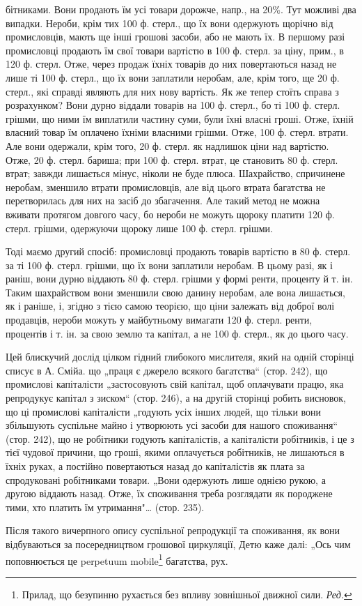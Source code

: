 \parcont{}  %
бітниками. Вони продають їм усі товари дорожче, напр., на 20\%. Тут можливі два випадки. Нероби, крім
тих 100 ф. стерл., що їх вони одержують щорічно від промисловців, мають ще інші грошові засоби, або
не мають їх. В першому разі промисловці продають їм свої товари вартістю в 100 ф. стерл. за ціну,
прим., в 120 ф. стерл. Отже, через продаж їхніх товарів до них повертаються назад не лише ті 100 ф.
стерл., що їх вони заплатили неробам, але, крім того, ще 20 ф. стерл., які справді являють для них
нову вартість. Як же тепер стоїть справа з розрахунком? Вони дурно віддали товарів на 100 ф. стерл.,
бо ті 100 ф. стерл. грішми, що ними їм виплатили частину суми, були їхні власні гроші. Отже, їхній
власний товар їм оплачено їхніми власними грішми. Отже, 100 ф. стерл. втрати. Але вони одержали,
крім того, 20 ф. стерл. як надлишок ціни над вартістю. Отже, 20 ф. стерл. бариша; при 100 ф. стерл.
втрат, це становить 80 ф. стерл. втрат; завжди лишається мінус, ніколи не буде плюса. Шахрайство,
спричинене неробам, зменшило втрати промисловців, але від цього втрата багатства не перетворилась
для них на засіб до збагачення. Але такий метод не можна вживати протягом довгого часу, бо нероби не
можуть щороку платити 120 ф. стерл. грішми, одержуючи щороку лише 100 ф. стерл. грішми.

Тоді маємо другий спосіб: промисловці продають товарів вартістю в 80 ф. стерл. за ті 100 ф. стерл.
грішми, що їх вони заплатили неробам. В цьому разі, як і раніш, вони дурно віддають 80 ф. стерл.
грішми у формі ренти, проценту й т. ін. Таким шахрайством вони зменшили свою данину неробам, але
вона лишається, як і раніше, і, згідно з тією самою теорією, що ціни залежать від доброї волі
продавців, нероби можуть у майбутньому вимагати 120 ф. стерл. ренти, процентів і т. ін. за свою
землю та капітал, а не 100 ф. стерл., як до цього часу.

Цей блискучий дослід цілком гідний глибокого мислителя, який на одній сторінці списує в А. Смійа. що
„праця є джерело всякого багатства“ (стор. 242), що промислові капіталісти „застосовують свій
капітал, щоб оплачувати працю, яка репродукує капітал з зиском“ (стор. 246), а на другій сторінці
робить висновок, що ці промислові капіталісти „годують
усіх інших людей, що тільки вони збільшують суспільне майно і утворюють усі засоби для нашого
споживання“ (стор. 242), що не робітники годують капіталістів, а капіталісти робітників, і це з тієї
чудової причини, що гроші, якими оплачується робітників, не лишаються в їхніх руках, а постійно
повертаються назад до капіталістів як плата за спродуковані робітниками товари. „Вони одержують лише
однією рукою, а другою віддають назад. Отже, їх споживання треба розглядати як породжене тими, хто
платить їм утримання"\dots{} (стор. 235).

Після такого вичерпного опису суспільної репродукції та споживання, як вони відбуваються за
посередництвом грошової циркуляції, Детю каже далі: „Ось чим поповнюється це perpetuum mobile\footnote*{Прилад, що безупинно рухається без впливу зовнішньої движної сили. \emph{Ред.}}
багатства, рух.
\parbreak{}  %

